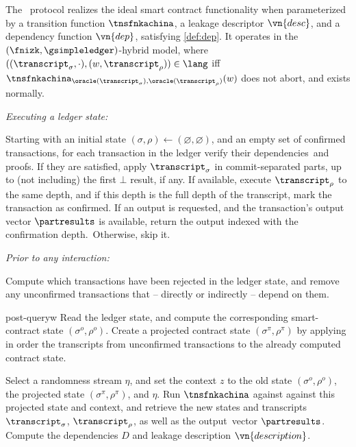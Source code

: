 \begin{protocolsketch}{\kachina}
  The \kachina\ protocol realizes the ideal smart contract functionality when
  parameterized by a transition function $\tnsfnkachina$, a leakage descriptor
  $\vn{desc}$, and a dependency function $\vn{dep}$, satisfying
    \autoref{def:dep}. It operates in the $(\fnizk, \gsimpleledger)$-hybrid
  model, where $((\transcript_\sigma, \cdot), (w, \transcript_\rho)) \in
    \lang$ iff $\tnsfnkachina_{\oracle(\transcript_\sigma),
      \oracle(\transcript_\rho)}(w)$ does not abort, and exists normally.

  \vspace{1em}\noindent\emph{Executing a ledger state:}

  Starting with an initial state $(\sigma, \rho) \gets (\varnothing,
  \varnothing)$, and an empty set of confirmed transactions, for each
  transaction in the ledger verify their dependencies\ and proofs. If they are
    satisfied, apply $\transcript_\sigma$ in commit-separated parts, up to (not
    including) the first $\bot$ result, if any. If available, execute
    $\transcript_\rho$ to the same depth, and if this depth is the full depth of
    the transcript, mark the transaction as confirmed. If an output is
    requested, and the transaction's output vector $\partresults$ is available,
    return the output indexed with the confirmation depth.\ Otherwise, skip it.

  \vspace{1em}\noindent\emph{Prior to any interaction:}

  Compute which transactions have been rejected in the ledger state, and remove
  any unconfirmed transactions that -- directly or indirectly -- depend on them.

  \begin{receivesketch}{post-query}{w}
    Read the ledger state, and compute the corresponding smart-contract state
    $(\sigma^o, \rho^o)$. Create a projected contract state $(\sigma^\pi,
    \rho^\pi)$ by applying in order the transcripts from unconfirmed
    transactions to the already computed contract state.

    Select a randomness stream $\eta$, and set the context $z$ to the old state
    $(\sigma^o, \rho^o)$, the projected state $(\sigma^\pi, \rho^\pi)$, and
    $\eta$. Run $\tnsfnkachina$ against against this projected state and context,
    and retrieve the new states and transcripts $\transcript_\sigma$,
    $\transcript_\rho$, as well as the output\ vector $\partresults$. Compute the dependencies $D$
    and leakage description $\vn{description}$.


\end{receivesketch}
\end{protocolsketch}
